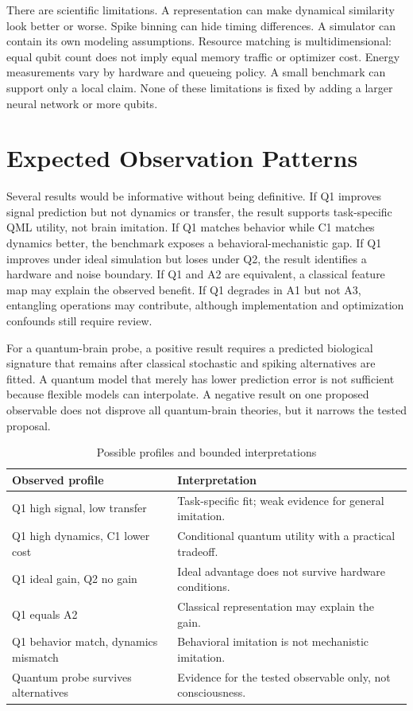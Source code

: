 \documentclass[conference]{IEEEtran}
\begin{document}
There are scientific limitations. A representation can make dynamical similarity look
better or worse. Spike binning can hide timing differences. A simulator can contain its
own modeling assumptions. Resource matching is multidimensional: equal qubit count does
not imply equal memory traffic or optimizer cost. Energy measurements vary by hardware
and queueing policy. A small benchmark can support only a local claim. None of these
limitations is fixed by adding a larger neural network or more qubits.

\section{Expected Observation Patterns}
\label{sec:patterns}

Several results would be informative without being definitive. If Q1 improves signal
prediction but not dynamics or transfer, the result supports task-specific QML utility,
not brain imitation. If Q1 matches behavior while C1 matches dynamics better, the
benchmark exposes a behavioral-mechanistic gap. If Q1 improves under ideal simulation but
loses under Q2, the result identifies a hardware and noise boundary. If Q1 and A2 are
equivalent, a classical feature map may explain the observed benefit. If Q1 degrades in
A1 but not A3, entangling operations may contribute, although implementation and
optimization confounds still require review.

For a quantum-brain probe, a positive result requires a predicted biological signature
that remains after classical stochastic and spiking alternatives are fitted. A quantum
model that merely has lower prediction error is not sufficient because flexible models
can interpolate. A negative result on one proposed observable does not disprove all
quantum-brain theories, but it narrows the tested proposal.

\begin{table}[t]
\caption{Possible profiles and bounded interpretations}
\label{tab:profiles}
\centering
\footnotesize
\begin{tabular}{p{}p{}}
\hline
Observed profile & Interpretation \\
\hline
Q1 high signal, low transfer & Task-specific fit; weak evidence for general imitation. \\
Q1 high dynamics, C1 lower cost & Conditional quantum utility with a practical tradeoff. \\
Q1 ideal gain, Q2 no gain & Ideal advantage does not survive hardware conditions. \\
Q1 equals A2 & Classical representation may explain the gain. \\
Q1 behavior match, dynamics mismatch & Behavioral imitation is not mechanistic imitation. \\
Quantum probe survives alternatives & Evidence for the tested observable only, not consciousness. \\
\hline
\end{tabular}
\end{table}
\end{document}

